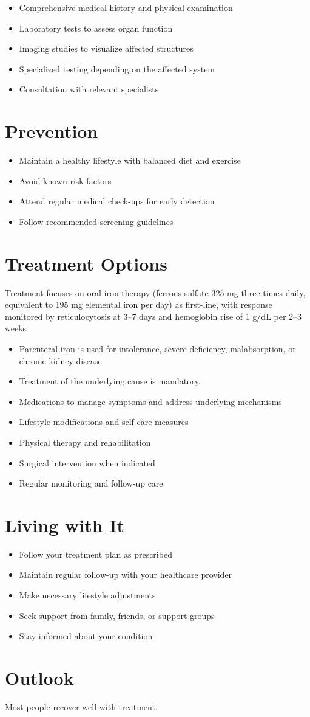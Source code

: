 \begin{itemize}[noitemsep]
  \item Comprehensive medical history and physical examination
  \item Laboratory tests to assess organ function
  \item Imaging studies to visualize affected structures
  \item Specialized testing depending on the affected system
  \item Consultation with relevant specialists
\end{itemize}
\section{Prevention}
\begin{itemize}[noitemsep]
  \item Maintain a healthy lifestyle with balanced diet and exercise
  \item Avoid known risk factors
  \item Attend regular medical check-ups for early detection
  \item Follow recommended screening guidelines
\end{itemize}
\section{Treatment Options}
Treatment focuses on oral iron therapy (ferrous sulfate 325 mg three times daily, equivalent to 195 mg elemental iron per day) as first-line, with response monitored by reticulocytosis at 3--7 days and hemoglobin rise of 1 g/dL per 2--3 weeks

\begin{itemize}[noitemsep]
  \item Parenteral iron is used for intolerance, severe deficiency, malabsorption, or chronic kidney disease
  \item Treatment of the underlying cause is mandatory.
  \item Medications to manage symptoms and address underlying mechanisms
  \item Lifestyle modifications and self-care measures
  \item Physical therapy and rehabilitation
  \item Surgical intervention when indicated
  \item Regular monitoring and follow-up care
\end{itemize}
\section{Living with It}
\begin{itemize}[noitemsep]
  \item Follow your treatment plan as prescribed
  \item Maintain regular follow-up with your healthcare provider
  \item Make necessary lifestyle adjustments
  \item Seek support from family, friends, or support groups
  \item Stay informed about your condition
\end{itemize}
\section{Outlook}
Most people recover well with treatment.
